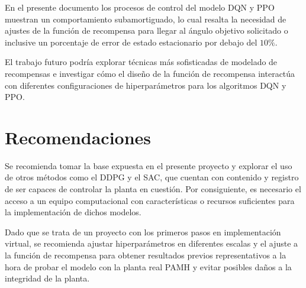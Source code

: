 En el presente documento los procesos de control del modelo DQN y PPO muestran un comportamiento subamortiguado, lo cual resalta la necesidad de ajustes de la función de recompensa para llegar al ángulo objetivo solicitado o inclusive un porcentaje de error de estado estacionario por debajo del $10 \%$.

El trabajo futuro podría explorar técnicas más sofisticadas de modelado de recompensas e investigar cómo el diseño de la función de recompensa interactúa con diferentes configuraciones de hiperparámetros para los algoritmos DQN y PPO.



\section{Recomendaciones}

Se recomienda tomar la base expuesta en el presente proyecto y explorar el uso de otros métodos como el DDPG y el SAC, que cuentan con contenido y registro de ser capaces de controlar la planta en cuestión. Por consiguiente, es necesario el acceso a un equipo computacional con características o recursos suficientes para la implementación de dichos modelos.

Dado que se trata de un proyecto con los primeros pasos en implementación virtual, se recomienda ajustar hiperparámetros en diferentes escalas y el ajuste a la función de recompensa para obtener resultados previos representativos a la hora de probar el modelo con la planta real PAMH y evitar posibles daños a la integridad de la planta. 

